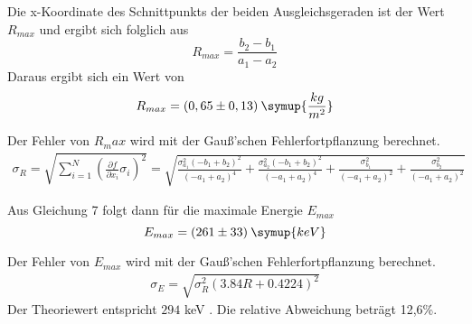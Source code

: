 Die x-Koordinate des Schnittpunkts der beiden Ausgleichsgeraden ist der Wert $R_{max}$ und ergibt
sich folglich aus
\begin{equation*}
  R_{max} =  \frac{b_2 - b_1}{a_1 - a_2}
\end{equation*}
Daraus ergibt sich ein Wert von
\begin{equation*}
  R_{max} = (0,65 \pm 0,13) \: \symup{\frac{kg}{m^2}}
\end{equation*}

Der Fehler von $R_max$ wird mit der Gauß'schen Fehlerfortpflanzung berechnet.
\begin{align*}
  \sigma_R = \sqrt{
      \sum\limits_{i = 1}^N
       \left( \frac{\partial f}{\partial x_i} \sigma_i \right)^{\!\! 2}
     }
     =\sqrt{\frac{\sigma_{a_{1}}^{2} \left(- b_{1} + b_{2}\right)^{2}}{\left(- a_{1} + a_{2}\right)^{4}}
  + \frac{\sigma_{a_{2}}^{2} \left(- b_{1} + b_{2}\right)^{2}}{\left(- a_{1} + a_{2}\right)^{4}} + \frac{\sigma_{b_{1}}^{2}}{\left(- a_{1}
  + a_{2}\right)^{2}} + \frac{\sigma_{b_{2}}^{2}}{\left(- a_{1} + a_{2}\right)^{2}}}
\end{align*}

Aus Gleichung 7 folgt dann für die maximale Energie $E_{max}$
\begin{equation*}
  E_{max} = (261 \pm 33) \: \symup{keV}
\end{equation*}

Der Fehler von $E_{max}$ wird mit der Gauß'schen Fehlerfortpflanzung berechnet.
\begin{align*}
  \sigma_E =\sqrt{\sigma_{R}^{2} \left(3.84 R + 0.4224\right)^{2}}
\end{align*}
Der Theoriewert entspricht $294$ keV \cite{sample2}. Die relative Abweichung beträgt 12,6\%.
